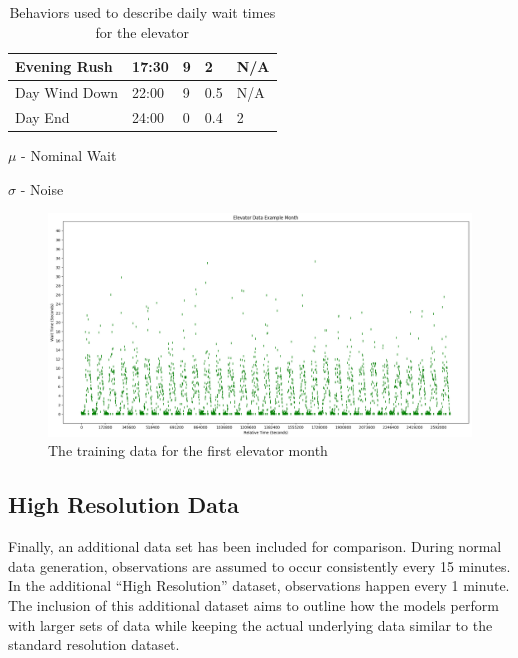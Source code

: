 \begin{table}[!htb]
\begin{tabular}{|l|l|l|l|l|}
      Evening Rush           & 17:30    & 9                                 & 2                             & N/A      \\ \hline
      Day Wind Down          & 22:00    & 9                                 & 0.5                           & N/A      \\ \hline
      Day End                & 24:00    & 0                                 & 0.4                           & 2        \\ \hline
    \end{tabular}
    \begin{tablenotes}
      \small
      \item $\mu$ - Nominal Wait
      \item $\sigma$ - Noise
    \end{tablenotes}
    \caption{Behaviors used to describe daily wait times for the elevator}
    \label{table:elevator_day_t}
  \end{table}



  \begin{figure}[!htb]
    \centering
    \includegraphics[width=\linewidth]{images/Elevator_Data_Example_Month.png}
    \caption{The training data for the first elevator month}
    \label{figure:Elevator Training Data}
  \end{figure}


  \subsection{ High Resolution Data }

  Finally, an additional data set has been included for comparison. During
  normal data generation, observations are assumed to occur consistently every
  15 minutes. In the additional ``High Resolution'' dataset, observations happen
  every 1 minute. The inclusion of this additional dataset aims to outline how
  the models perform with larger sets of data while keeping the actual
  underlying data similar to the standard resolution dataset. \\


